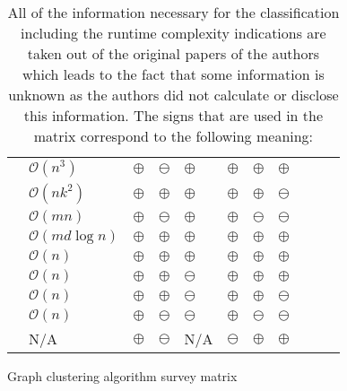 \documentclass[12pt,a4paper]{report}
\begin{document}
\begin{table}[ht!]
\def\arraystretch{1.60}
\begin{tabularx}{\textwidth}{|Y||p{2.5cm}|Y|Y|Y|Y|Y|Y|Y|Y|Y|}
 \hline
  &  &  &  &  &  &  &  \\
 \hline\hline
 \cite{girvan2002community}     & \(\mathcal{O}(n^3)\)          & $\oplus$  & $\ominus$  & $\oplus$   & $\oplus$  & $\oplus$  & $\oplus$ \\\hline
 \cite{vandongen2000graph}      & \(\mathcal{O}(nk^2)\)         & $\oplus$  & $\oplus$   & $\oplus$   & $\oplus$  & $\oplus$  & $\ominus$ \\\hline
 \cite{pons2005computing}       & \(\mathcal{O}(mn)\)           & $\oplus$  & $\ominus$  & $\oplus$   & $\oplus$  & $\ominus$ & $\ominus$ \\\hline
 \cite{clauset2004modularity}   & \(\mathcal{O}(md \log{n})\)   & $\oplus$  & $\oplus$   & $\oplus$   & $\oplus$  & $\oplus$  & $\oplus$ \\\hline
 \cite{blondel2008modularity}   & \(\mathcal{O}(n)\)            & $\oplus$  & $\oplus$   & $\oplus$   & $\oplus$  & $\oplus$  & $\oplus$ \\\hline
 \cite{rosvall2008infomap}      & \(\mathcal{O}(n)\)            & $\oplus$  & $\oplus$   & $\ominus$  & $\oplus$  & $\oplus$  & $\oplus$ \\\hline
 \cite{biemann2006chinese}      & \(\mathcal{O}(n)\)            & $\oplus$  & $\oplus$   & $\ominus$  & $\oplus$  & $\oplus$  & $\ominus$ \\\hline
 \cite{reichardt2004detecting}  & \(\mathcal{O}(n)\)            & $\oplus$  & $\ominus$  & $\ominus$  & $\oplus$  & $\ominus$ & $\ominus$ \\\hline
 \cite{donetti2004detecting}    & N/A                           & $\oplus$  & $\ominus$  & N/A        & $\ominus$  & $\oplus$  & $\oplus$ \\\hline
\end{tabularx}
\caption{Graph clustering algorithm survey matrix}
\caption*{
  All of the information necessary for the classification including the
  runtime complexity indications are taken out of the original papers of the
  authors which leads to the fact that some information is unknown as
  the authors did not calculate or disclose this information.
  The signs that are used in the matrix correspond to the following meaning:
}
\end{table}
\end{document}
